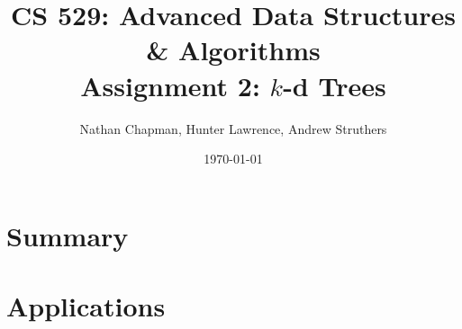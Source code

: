 \documentclass{article}
\title{\vspace*{-0.625in}CS 529: Advanced Data Structures \& Algorithms \\ Assignment 2: $k$-d Trees}
\author{Nathan Chapman, Hunter Lawrence, Andrew Struthers}
\date{\today}
\begin{document}
    \maketitle

    \section*{Summary}

        

    \section*{Applications}

    \printbibliography
\end{document}
